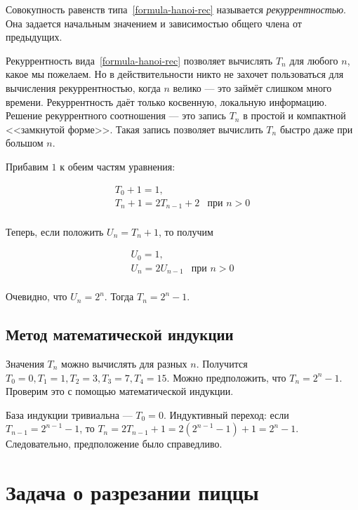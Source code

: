 \documentclass[14pt]{book}
\begin{document}
Совокупность равенств типа~\ref{formula-hanoi-rec} называется \emph{рекуррентностью}. Она задается
начальным значением и зависимостью общего члена от предыдущих.

Рекуррентность вида~\ref{formula-hanoi-rec} позволяет вычислять $T_n$ для любого $n$, какое мы пожелаем. Но в действительности
никто не захочет пользоваться для вычисления рекуррентностью, когда $n$ велико --- это займёт
слишком много времени. Рекуррентность даёт только косвенную, локальную информацию.
Решение рекуррентного соотношения --- это запись $T_n$ в простой и компактной
<<замкнутой форме>>. Такая запись позволяет вычислить $T_n$ быстро даже при большом $n$.

Прибавим $1$ к обеим частям уравнения:

\begin{equation}
\begin{array}{ll}
T_0 + 1 = 1, \\
T_n + 1 = 2T_{n-1} + 2 & \text{при } n > 0 \\
\end{array}
\end{equation}

Теперь, если положить $U_n = T_n + 1$, то получим 

\begin{equation}
\begin{array}{ll}
U_0 = 1, \\
U_n = 2U_{n-1} & \text{при } n > 0 \\
\end{array}
\end{equation}

Очевидно, что $U_n = 2^n$. Тогда $T_n = 2^n - 1$.


\subsection{Метод математической индукции}

Значения $T_n$ можно вычислять для разных $n$. Получится $T_0=0, T_1=1, T_2=3, T_3=7, T_4=15$.
Можно предположить, что $T_n=2^n-1$. Проверим это с помощью математической индукции.

База индукции тривиальна --- $T_0 = 0$. Индуктивный переход: если $T_{n-1}=2^{n-1}-1$, то
$T_n = 2T_{n-1}+1 = 2(2^{n-1}-1)+1 = 2^n - 1$. Следовательно, предположение было справедливо.

\section{Задача о разрезании пиццы}
\end{document}
